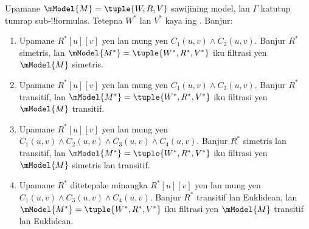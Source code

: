 \documentclass[../../../include/open-logic-section]{subfiles}
\begin{document}
\begin{thm}
  Upamane $\mModel{M} =\tuple{W,R,V}$ sawijining model, lan $\Gamma$
  katutup tumrap sub-!!{formula}s. Tetepna $W^*$ lan $V^*$ kaya ing
  . Banjur:
  \begin{enumerate}
  \item Upamane $R^*[u][v]$ yen lan mung yen $C_1(u, v) \land
    C_2(u,v)$. Banjur $R^*$ simetris, lan $\mModel{M^*} =
    \tuple{W^*,R^*,V^*}$ iku filtrasi yen $\mModel{M}$ simetris.
  \item Upamane $R^*[u][v]$ yen lan mung yen $C_1(u, v)
    \land C_3(u,v)$. Banjur $R^*$ transitif, lan
    $\mModel{M^*}=\tuple{W^*,R^*,V^*}$ iku filtrasi yen
    $\mModel{M}$ transitif.
  \item Upamane $R^*[u][v]$ yen lan mung yen $C_1(u, v) \land C_2(u,v)
    \land C_3(u,v) \land C_4(u,v)$. Banjur $R^*$ simetris lan
    transitif, lan $\mModel{M^*}=\tuple{W^*,R^*,V^*}$ iku filtrasi
    yen $\mModel{M}$ simetris lan transitif.
  \item Upamane $R^*$ ditetepake minangka $R^*[u][v]$ yen lan mung yen
    $C_1(u, v) \land C_3(u,v) \land C_4(u,v)$. Banjur $R^*$ transitif
    lan Euklidean, lan $\mModel{M^*}=\tuple{W^*,R^*,V^*}$ iku filtrasi
    yen $\mModel{M}$ transitif lan Euklidean.
  \end{enumerate}
\end{thm}
\end{document}
